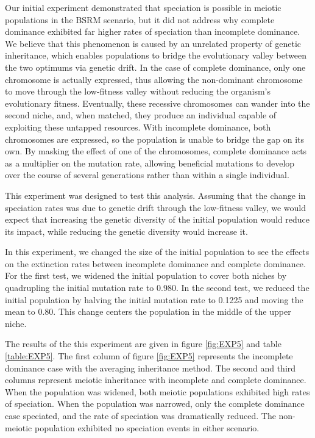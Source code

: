 \documentclass{article}
\begin{document}
Our initial experiment demonstrated that speciation is possible in meiotic populations in the BSRM scenario, but it did not address why complete dominance exhibited far higher rates of speciation than incomplete dominance. We believe that this phenomenon is caused by an unrelated property of genetic inheritance, which enables populations to bridge the evolutionary valley between the two optimums via genetic drift. In the case of complete dominance, only one chromosome is actually expressed, thus allowing the non-dominant chromosome to move through the low-fitness valley without reducing the organism’s evolutionary fitness. Eventually, these recessive chromosomes can wander into the second niche, and, when matched, they produce an individual capable of exploiting these untapped resources. With incomplete dominance, both chromosomes are expressed, so the population is unable to bridge the gap on its own. By masking the effect of one of the chromosomes, complete dominance acts as a multiplier on the mutation rate, allowing beneficial mutations to develop over the course of several generations rather than within a single individual. 

This experiment was designed to test this analysis. Assuming that the change in speciation rates was due to genetic drift through the low-fitness valley, we would expect that increasing the genetic diversity of the initial population would reduce its impact, while reducing the genetic diversity would increase it.

In this experiment, we changed the size of the initial population to see the effects on the extinction rates between incomplete dominance and complete dominance. For the first test, we widened the initial population to cover both niches by quadrupling the initial mutation rate to 0.980. In the second test, we reduced the initial population by halving the initial mutation rate to 0.1225 and moving the mean to 0.80. This change centers the population in the middle of the upper niche.

The results of the this experiment are given in figure \ref{fig:EXP5} and table \ref{table:EXP5}. The first column of figure \ref{fig:EXP5} represents the incomplete dominance case with the averaging inheritance method. The second and third columns represent meiotic inheritance with incomplete and complete dominance. When the population was widened, both meiotic populations exhibited high rates of speciation. When the population was narrowed, only the complete dominance case speciated, and the rate of speciation was dramatically reduced. The non-meiotic population exhibited no speciation events in either scenario. 
\end{document}

